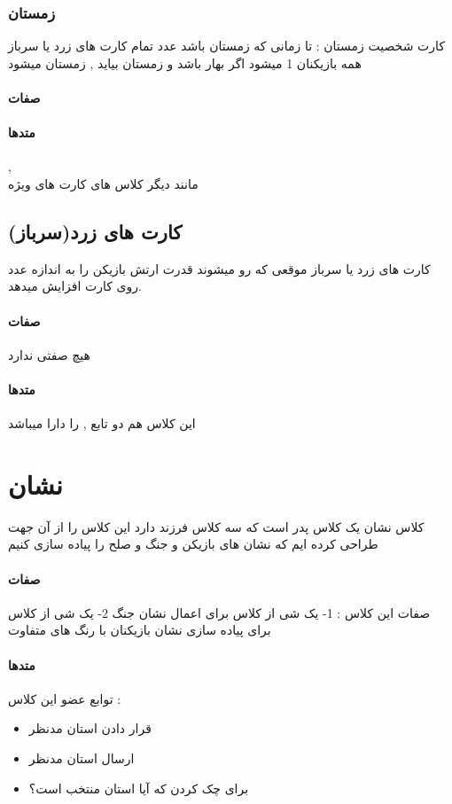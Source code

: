 \documentclass[pdf,titlepage,a4paper]{report}
\begin{document}
	\subsubsection{زمستان}
	کارت شخصیت زمستان : تا زمانی که زمستان باشد عدد تمام کارت های زرد یا سرباز همه بازیکنان 1 میشود اگر بهار باشد و زمستان بیاید , زمستان میشود
	\paragraph{صفات}
	\paragraph{متدها}
	 ,  \\
	مانند دیگر کلاس های کارت های ویژه

	\subsection{کارت های زرد(سرباز)}
	کارت های زرد یا سرباز موقعی که رو میشوند قدرت ارتش بازیکن را به اندازه عدد روی کارت افزایش میدهد.

	\paragraph{صفات}
	هیچ صفتی ندارد 
	\paragraph{متدها}
	این کلاس هم دو تابع  ,  را دارا میباشد
	\newpage
	
	\section{نشان}
	کلاس نشان یک کلاس پدر است که سه کلاس فرزند دارد این کلاس را از آن جهت طراحی کرده ایم که نشان های بازیکن و جنگ و صلح را پیاده سازی کنیم
	\paragraph{صفات}
     صفات این کلاس :
	 1- یک شی از کلاس   برای اعمال نشان جنگ
	 2- یک شی از کلاس  برای پیاده سازی نشان بازیکنان با رنگ های متفاوت
	\paragraph{متدها}
	 توابع عضو این کلاس :

	\begin{itemize}
		\item {} قرار دادن استان مدنظر
		\item {} ارسال استان مدنظر 
		\item {}برای چک کردن که آیا استان منتخب است؟
	\end{itemize}
	 
\end{document}
